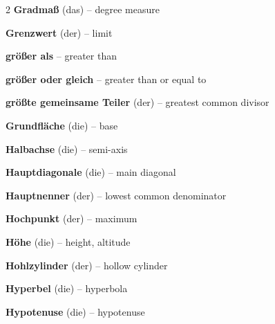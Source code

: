 \begin{multicols}{2}
\textbf{Gradmaß} (das) -- degree measure\dotfill\hyperref[e:138]{\pageref*{e:138}}\par
\textbf{Grenzwert} (der) -- limit\dotfill\hyperref[e:264]{\pageref*{e:264}}\par
\textbf{größer als} -- greater than\dotfill\hyperref[e:64]{\pageref*{e:64}}\par
\textbf{größer oder gleich} -- greater than or equal to\dotfill\hyperref[e:66]{\pageref*{e:66}}\par
\textbf{größte gemeinsame Teiler} (der) -- greatest common divisor\dotfill\hyperref[e:56]{\pageref*{e:56}}\par
\textbf{Grundfläche} (die) -- base\dotfill\hyperref[e:248]{\pageref*{e:248}}\par

\par\nopagebreak
\textbf{Halbachse} (die) -- semi-axis\dotfill\hyperref[e:317]{\pageref*{e:317}}\par
\textbf{Hauptdiagonale} (die) -- main diagonal\dotfill\hyperref[e:324]{\pageref*{e:324}}\par
\textbf{Hauptnenner} (der) -- lowest common denominator\dotfill\hyperref[e:36]{\pageref*{e:36}}\par
\textbf{Hochpunkt} (der) -- maximum\dotfill\hyperref[e:282]{\pageref*{e:282}}\par
\textbf{Höhe} (die) -- height, altitude\dotfill\hyperref[e:191]{\pageref*{e:191}}\par
\textbf{Hohlzylinder} (der) -- hollow cylinder\dotfill\hyperref[e:237]{\pageref*{e:237}}\par
\textbf{Hyperbel} (die) -- hyperbola\dotfill\hyperref[e:315]{\pageref*{e:315}}\par
\textbf{Hypotenuse} (die) -- hypotenuse\dotfill\hyperref[e:186]{\pageref*{e:186}}\par


\end{multicols}
